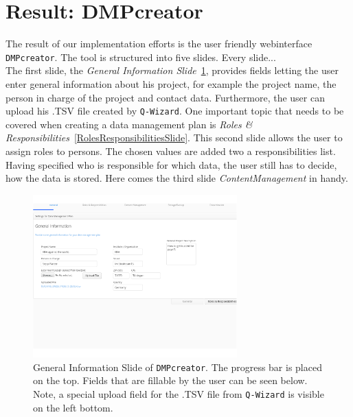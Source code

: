 
\section{Result: DMPcreator}
The result of our implementation efforts is the user friendly webinterface \texttt{DMPcreator}. The tool is structured into five slides. Every slide...\\
The first slide, the \textit{General Information Slide}~\ref{GeneralInformationSlide}, provides fields letting the user enter general information about his project, for example the project name, the person in charge of the project and contact data. Furthermore, the user can upload his .TSV file created by \texttt{Q-Wizard}. One important topic that needs to be covered when creating a data management plan is \textit{Roles \& Responsibilities}~\ref{RolesResponsibilitiesSlide}. This second slide allows the user to assign roles to persons. The chosen values are added two a responsibilities list. Having specified who is responsible for which data, the user still has to decide, how the data is stored. Here comes the third slide \textit{ContentManagement} in handy.
\begin{figure}[]
	\centering
    \includegraphics[width=0.7\textwidth]{pictures/GeneralInformation.png}
    \caption{General Information Slide of \texttt{DMPcreator}. The progress bar is placed on the top. Fields that are fillable by the user can be seen below. Note, a special upload field for the .TSV file from \texttt{Q-Wizard} is visible on the left bottom.}
    \label{GeneralInformationSlide}
\end{figure}


